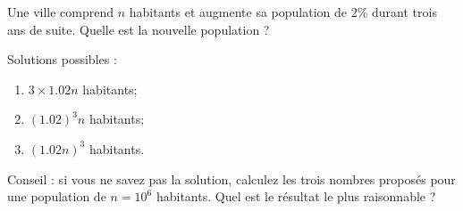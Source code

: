 
\begin{exercice}\label{exoPremiere-0017}

        Une ville comprend \( n\) habitants et augmente sa population de \( 2\%\) durant trois ans de suite. Quelle est la nouvelle population ?

        Solutions possibles :
        \begin{enumerate}
            \item
                \( 3\times 1.02n\) habitants;
            \item
                \( (1.02)^3n\) habitants;
            \item
                \( (1.02n)^3\) habitants.
        \end{enumerate}
        Conseil : si vous ne savez pas la solution, calculez les trois nombres proposés pour une population de \( n=10^6\) habitants. Quel est le résultat le plus raisonnable ?

\end{exercice}

